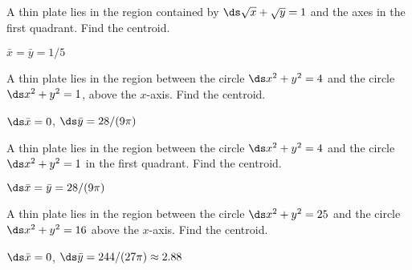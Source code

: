 \begin{exercises}
\exercise A thin plate lies in the region contained by 
$\ds \sqrt{x}+\sqrt{y}=1$ and the axes in the first quadrant.
Find the centroid.
\begin{answer} $\bar x=\bar y=1/5$
\end{answer}

\exercise A thin plate lies in the region between
the circle $\ds x^2+y^2=4$ and the circle $\ds x^2+y^2=1$, above the $x$-axis.
Find the centroid.
\begin{answer} $\ds \bar x=0$, $\ds \bar y=28/(9\pi)$
\end{answer}

\exercise A thin plate lies in the region between 
the circle $\ds x^2+y^2=4$ and the circle $\ds x^2+y^2=1$ in the first quadrant.
Find the centroid.
\begin{answer} $\ds \bar x=\bar y=28/(9\pi)$
\end{answer}

\exercise A thin plate lies in the region between 
the circle $\ds x^2+y^2=25$ and the circle $\ds x^2+y^2=16$
above the $x$-axis.
Find the centroid.
\begin{answer} $\ds \bar x=0$, $\ds\bar y=244/(27\pi)\approx 2.88$
\end{answer}

\end{exercises}
